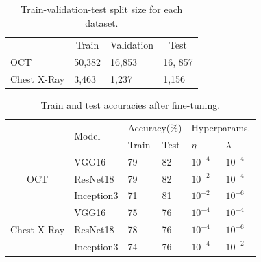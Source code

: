 \begin{table}[ht]
\begin{tabular}{|l|l|l|l|}
\hline
\multirow{2}{*}{} & \multicolumn{1}{c|}{\multirow{2}{*}{Train}} & \multicolumn{1}{c|}{\multirow{2}{*}{Validation}} & \multicolumn{1}{c|}{\multirow{2}{*}{Test}} \\
 & \multicolumn{1}{c|}{} & \multicolumn{1}{c|}{} & \multicolumn{1}{c|}{} \\ \hline
OCT & 50,382 & 16,853 & 16, 857 \\ \hline
Chest X-Ray & 3,463 & 1,237 & 1,156 \\ \hline
\end{tabular}
\caption{Train-validation-test split size for each dataset.}
\label{tbl:dataset_sizes}
\end{table}

\begin{table}[ht]
\begin{tabular}{|c|l|l|l|l|l|l|}
\hline
\multicolumn{1}{|l|}{\multirow{3}{*}{}} & \multirow{3}{*}{Model} & \multicolumn{2}{l|}{\multirow{2}{*}{Accuracy(\%)}} & \multicolumn{3}{l|}{\multirow{2}{*}{Hyperparams.}} \\
\multicolumn{1}{|l|}{} &  & \multicolumn{2}{l|}{} & \multicolumn{3}{l|}{} \\ \cline{3-7} 
\multicolumn{1}{|l|}{} &  & Train & Test & \multicolumn{2}{l|}{$\eta$} & $\lambda$ \\ \hline
\multirow{3}{*}{OCT} & VGG16 & 79 & 82 & \multicolumn{2}{l|}{$10^{-4}$} & $10^{-4}$ \\ \cline{2-7} 
 & ResNet18 & 79 & 82 & \multicolumn{2}{l|}{$10^{-2}$} & $10^{-4}$ \\ \cline{2-7} 
 & Inception3 & 71 & 81 & \multicolumn{2}{l|}{$10^{-2}$} & $10^{-6}$ \\ \hline
\multirow{3}{*}{Chest X-Ray} & VGG16 & 75 & 76 & \multicolumn{2}{l|}{$10^{-4}$} & $10^{-4}$ \\ \cline{2-7} 
 & ResNet18 & 78 & 76 & \multicolumn{2}{l|}{$10^{-4}$} & $10^{-6}$ \\ \cline{2-7} 
 & Inception3 & 74 & 76 & \multicolumn{2}{l|}{$10^{-4}$} & $10^{-2}$ \\ \hline
\end{tabular}
\caption{Train and test accuracies after fine-tuning.}
\label{tbl:finetune_accuracies}
\end{table}







